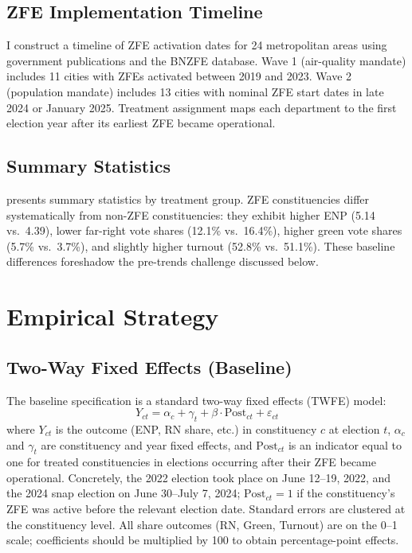 \documentclass[12pt]{article}
\begin{document}
\subsection{ZFE Implementation Timeline}

I construct a timeline of ZFE activation dates for 24 metropolitan areas using government publications and the BNZFE database. Wave 1 (air-quality mandate) includes 11 cities with ZFEs activated between 2019 and 2023. Wave 2 (population mandate) includes 13 cities with nominal ZFE start dates in late 2024 or January 2025. Treatment assignment maps each department to the first election year after its earliest ZFE became operational.

\subsection{Summary Statistics}

 presents summary statistics by treatment group. ZFE constituencies differ systematically from non-ZFE constituencies: they exhibit higher ENP (5.14 vs.\ 4.39), lower far-right vote shares (12.1\% vs.\ 16.4\%), higher green vote shares (5.7\% vs.\ 3.7\%), and slightly higher turnout (52.8\% vs.\ 51.1\%). These baseline differences foreshadow the pre-trends challenge discussed below.




\section{Empirical Strategy}

\subsection{Two-Way Fixed Effects (Baseline)}

The baseline specification is a standard two-way fixed effects (TWFE) model:
\begin{equation}
Y_{ct} = \alpha_c + \gamma_t + \beta \cdot \text{Post}_{ct} + \varepsilon_{ct}
\label{eq:twfe}
\end{equation}
where $Y_{ct}$ is the outcome (ENP, RN share, etc.) in constituency $c$ at election $t$, $\alpha_c$ and $\gamma_t$ are constituency and year fixed effects, and $\text{Post}_{ct}$ is an indicator equal to one for treated constituencies in elections occurring after their ZFE became operational. Concretely, the 2022 election took place on June 12--19, 2022, and the 2024 snap election on June 30--July 7, 2024; $\text{Post}_{ct} = 1$ if the constituency's ZFE was active before the relevant election date. Standard errors are clustered at the constituency level. All share outcomes (RN, Green, Turnout) are on the 0--1 scale; coefficients should be multiplied by 100 to obtain percentage-point effects.
\end{document}
